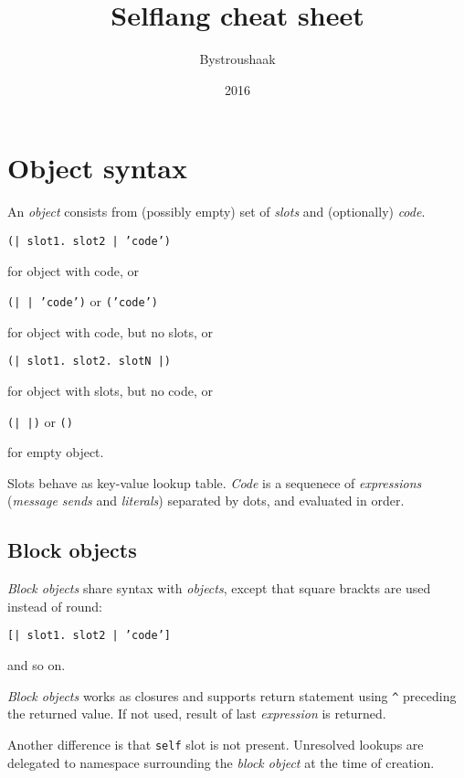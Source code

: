 \documentclass[10pt]{article}
\title{Selflang cheat sheet}
\author{Bystroushaak}
\date{2016}
\renewcommand{\maketitle}{
    {\begin{center}\Large \mythetitle\end{center}}
}
\begin{document}
\begin{multicols*}{3}
\maketitle

\section{Object syntax}
An \textit{object} consists from (possibly empty) set of \textit{slots} and (optionally) \textit{code}.

\vspace*{0.2cm}
\texttt{(| slot1. slot2 | 'code')}

for object with code, or

\texttt{(| | 'code')} or \texttt{('code')}

for object with code, but no slots, or

\texttt{(| slot1. slot2. slotN |)}

for object with slots, but no code, or

\texttt{(| |)} or \texttt{()}

for empty object.
\vspace*{0.2cm}

Slots behave as key-value lookup table. \textit{Code} is a sequenece of \textit{expressions} (\textit{message sends} and \textit{literals}) separated by dots, and evaluated in order.

\subsection{Block objects}
\textit{Block objects} share syntax with \textit{objects}, except that square brackts are used instead of round:

\vspace*{0.2cm}
\texttt{[| slot1. slot2 | 'code']}
\vspace*{0.2cm}

and so on.

\textit{Block objects} works as closures and supports return statement using \texttt{\^} preceding the returned value. If not used, result of last \textit{expression} is returned.

Another difference is that \texttt{self} slot is not present. Unresolved lookups are delegated to namespace surrounding the \textit{block object} at the time of creation.



\end{multicols*}
\end{document}
